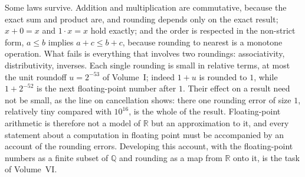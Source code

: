 \begin{table}
\end{table}

Some laws survive. Addition and multiplication are commutative, because the exact sum and product are, and rounding depends only on the exact result; $x+0=x$ and $1\cdot x=x$ hold exactly; and the order is respected in the non-strict form, $a\le b$ implies $a+c\le b+c$, because rounding to nearest is a monotone operation. What fails is everything that involves two roundings: associativity, distributivity, inverses. Each single rounding is small in relative terms, at most the unit roundoff $u=2^{-53}$ of Volume~I; indeed $1+u$ is rounded to $1$, while $1+2^{-52}$ is the next floating-point number after $1$. Their effect on a result need not be small, as the line on cancellation shows: there one rounding error of size $1$, relatively tiny compared with $10^{16}$, is the whole of the result. Floating-point arithmetic is therefore not a model of $\mathbb R$ but an approximation to it, and every statement about a computation in floating point must be accompanied by an account of the rounding errors. Developing this account, with the floating-point numbers as a finite subset of $\mathbb Q$ and rounding as a map from $\mathbb R$ onto it, is the task of Volume~VI.

